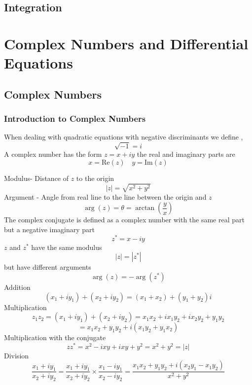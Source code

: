 \documentclass[11pt,titlepage]{article}
\numberwithin{equation}{section}
\begin{document}
\subsection{Integration}



\section{Complex Numbers and Differential Equations}
\subsection{Complex Numbers}
\subsubsection{Introduction to Complex Numbers}
When dealing with quadratic equations with negative discriminants we define ,
\begin{equation}
    \sqrt{ -1 }=i
\end{equation}
A complex number has the form $z=x+iy$ the real and imaginary parts are
\begin{equation}
    x=\mathrm{Re}(z) \quad y=\mathrm{Im}(z)
\end{equation}

Modulus- Distance of $z$ to the origin
\begin{equation}
    |z|=\sqrt{ x^2+y^2 }
\end{equation}
Argument - Angle from real line to the line between the origin and $z$
\begin{equation}
    \arg(z)=\theta=\arctan\left( \frac{y}{x} \right)
\end{equation}
The complex conjugate is defined as a complex number with the same real part but a negative imaginary part
\begin{equation}
    z^{*}=x-iy
\end{equation}
$z$ and $z^{*}$ have the same modulus
\begin{equation}
    |z|=|z^{*}|
\end{equation}
but have different arguments 
\begin{equation}
    \arg(z)=-\arg(z^{*})
\end{equation}
Addition
$$(x_{1}+iy_{1})+(x_{2}+iy_{2})=(x_{1}+x_{2})+(y_{1}+y_{2})i$$
Multiplication
$$z_{1}z_{2}=(x_{1}+iy_{1})+(x_{2}+iy_{2})=x_{1}x_{2}+ix_{1}y_{2}+ix_{2}y_{2}+y_{1}y_{2}$$
$$=x_{1}x_{2}+y_{1}y_{2}+i(x_{1}y_{2}+y_{1}x_{2})$$
Multiplication with the conjugate
$$zz^{*}=x^2-ixy+ixy+y^2=x^2+y^2=|z|$$
Division
$$\frac{x_{1}+iy_{1}}{x_{2}+iy_{2}}=\frac{x_{1}+iy_{1}}{x_{2}+iy_{2}}\times\frac{x_{1}-iy_{1}}{x_{2}-iy_{2}}=\frac{x_{1}x_{2}+y_{1}y_{2}+i(x_{2}y_{1}-x_{1}y_{2})}{x^2+y^2}$$
\end{document}
